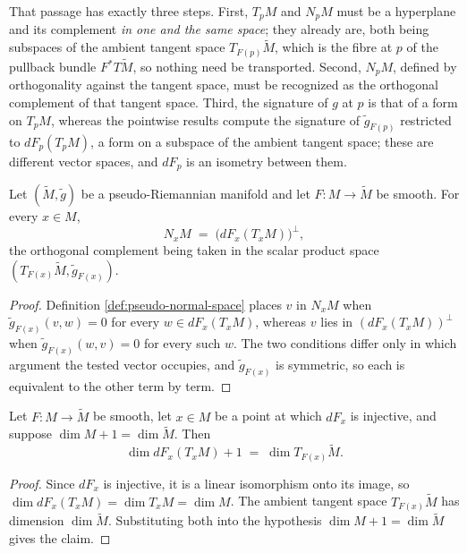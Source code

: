 That passage has exactly three steps. First, $T_pM$ and $N_pM$ must be a hyperplane and its complement \emph{in one and the same space}; they already are, both being subspaces of the ambient tangent space $T_{F(p)}\tilde{M}$, which is the fibre at $p$ of the pullback bundle $F^*T\tilde{M}$, so nothing need be transported. Second, $N_pM$, defined by orthogonality against the tangent space, must be recognized as the orthogonal complement of that tangent space. Third, the signature of $g$ at $p$ is that of a form on $T_pM$, whereas the pointwise results compute the signature of $\tilde{g}_{F(p)}$ restricted to $dF_p(T_pM)$, a form on a subspace of the ambient tangent space; these are different vector spaces, and $dF_p$ is an isometry between them.

\begin{lemma}
\label{lem:pseudo-normal-space-eq-orthogonal}
\leanok
{}
Let $(\tilde{M},\tilde{g})$ be a pseudo-Riemannian manifold and let $F : M \to \tilde{M}$ be smooth. For every $x \in M$,
\[
  N_xM \;=\; \bigl(dF_x(T_xM)\bigr)^{\perp},
\]
the orthogonal complement being taken in the scalar product space $(T_{F(x)}\tilde{M}, \tilde{g}_{F(x)})$.
\end{lemma}

\begin{proof}
\leanok
{}
Definition \ref{def:pseudo-normal-space} places $v$ in $N_xM$ when $\tilde{g}_{F(x)}(v,w) = 0$ for every $w \in dF_x(T_xM)$, whereas $v$ lies in $(dF_x(T_xM))^\perp$ when $\tilde{g}_{F(x)}(w,v) = 0$ for every such $w$. The two conditions differ only in which argument the tested vector occupies, and $\tilde{g}_{F(x)}$ is symmetric, so each is equivalent to the other term by term.
\end{proof}

\begin{lemma}
\label{lem:hypersurface-tangent-hyperplane}
\leanok
Let $F : M \to \tilde{M}$ be smooth, let $x \in M$ be a point at which $dF_x$ is injective, and suppose $\dim M + 1 = \dim \tilde{M}$. Then
\[
  \dim dF_x(T_xM) + 1 \;=\; \dim T_{F(x)}\tilde{M} .
\]
\end{lemma}

\begin{proof}
\leanok
Since $dF_x$ is injective, it is a linear isomorphism onto its image, so $\dim dF_x(T_xM) = \dim T_xM = \dim M$. The ambient tangent space $T_{F(x)}\tilde{M}$ has dimension $\dim\tilde{M}$. Substituting both into the hypothesis $\dim M + 1 = \dim \tilde{M}$ gives the claim.
\end{proof}

